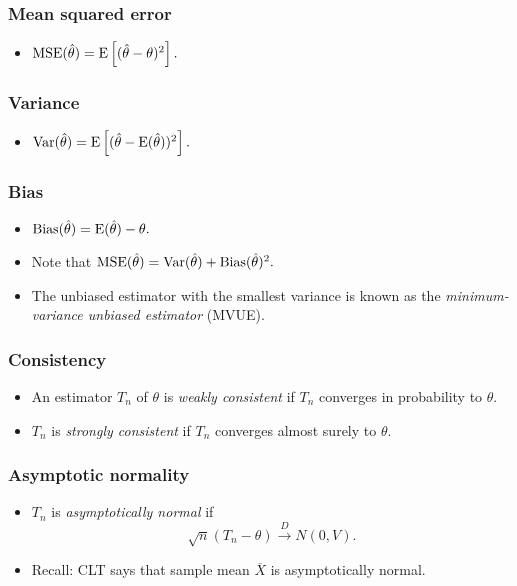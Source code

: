 \subsubsection{Mean squared error}
\begin{itemize}
	\item $\operatorname{MSE}(\hat{\theta}) = \operatorname{E}\left[(\hat{\theta}-\theta)^2\right].$
\end{itemize}

\subsubsection{Variance}
\begin{itemize}
	\item $\operatorname{Var}(\hat{\theta}) = \operatorname{E}\left[(\hat{\theta} - \operatorname{E}(\hat{\theta}))^2\right].$
\end{itemize}

\subsubsection{Bias}
\begin{itemize}
	\item $\operatorname{Bias}(\hat{\theta}) = \operatorname{E}(\hat{\theta}) - \theta.$
	\item Note that $\operatorname{MSE}(\hat{\theta}) = \operatorname{Var}(\hat{\theta}) + \operatorname{Bias}(\hat{\theta})^2.$
	\item The unbiased estimator with the smallest variance is known as the \textit{minimum-variance unbiased estimator} (MVUE).
\end{itemize}

\subsubsection{Consistency}
\begin{itemize}
	\item An estimator $T_n$ of $\theta$ is \textit{weakly consistent} if $T_n$ converges in probability to $\theta.$
	\item $T_n$ is \textit{strongly consistent} if $T_n$ converges almost surely to $\theta.$
\end{itemize}

\subsubsection{Asymptotic normality}
\begin{itemize}
	\item $T_n$ is \textit{asymptotically normal} if \[ \sqrt{n}(T_n - \theta) \xrightarrow{D} N(0,V). \]
	\item Recall: CLT says that sample mean $\overline{X}$ is asymptotically normal.
\end{itemize}

